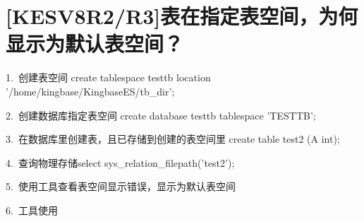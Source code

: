 \documentclass[letterpaper,10pt,english]{sphinxmanual}
\begin{document}
\section{{[}KESV8R2/R3{]}表在指定表空间，为何显示为默认表空间？}
\label{\detokenize{system-management:kesv8r2-r3}}
1. 创建表空间 create tablespace testtb location '/home/kingbase/KingbaseES/tb\_dir';

2. 创建数据库指定表空间 create database testtb tablespace 'TESTTB';

3. 在数据库里创建表，且已存储到创建的表空间里 create table test2 (A int);

4. 查询物理存储select sys\_relation\_filepath('test2');

\begin{sphinxVerbatim}[commandchars=\\\{\}]
\end{sphinxVerbatim}

5. 使用工具查看表空间显示错误，显示为默认表空间

6. 工具使用

\begin{sphinxVerbatim}[commandchars=\\\{\}]
       

 
\end{sphinxVerbatim}
\end{document}
